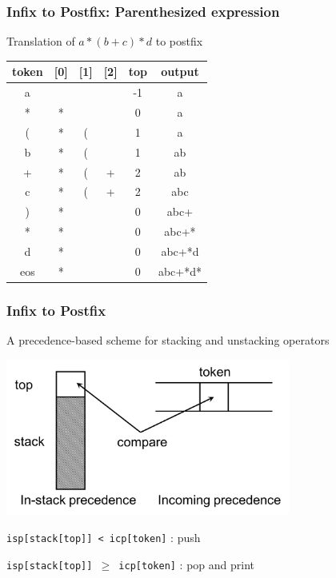 \documentclass[newPxFont,sthlmFooter,nooffset]{beamer}
\begin{document}
\begin{frame}[t]
  \frametitle{Infix to Postfix: Parenthesized expression}

Translation of $a*(b+c)*d$ to postfix
  \begin{center}
    \begin{tabular}{c | c c c | c | c}
      token & [0] & [1] & [2] & top & output \\ \hline
                  a &   &   &   & -1 & a \\
      * & * &   &   & 0 & a \\
      ( & * & ( &   & 1 & a \\
      b & * & ( &   & 1 & ab \\
      + & * & ( & + & 2 & ab \\
      c & * & ( & + & 2 & abc \\
      ) & * &   &   & 0 & abc+\\
      * & * &   &   & 0 & abc+*\\
      d & * &   &   & 0 & abc+*d\\
   eos & * &   &   & 0 & abc+*d*\\
    \end{tabular}
  \end{center}
\end{frame}

\begin{frame}[t]
  \frametitle{Infix to Postfix}
A precedence-based scheme for stacking and unstacking operators
\begin{center}
  \includegraphics[width=0.7\textwidth]{figures/fig07_postfix.png}
\end{center}
\texttt{isp[stack[top]] < icp[token]} : push

\texttt{isp[stack[top]] $\geq$ icp[token]} : pop and print

\end{frame}
\end{document}
